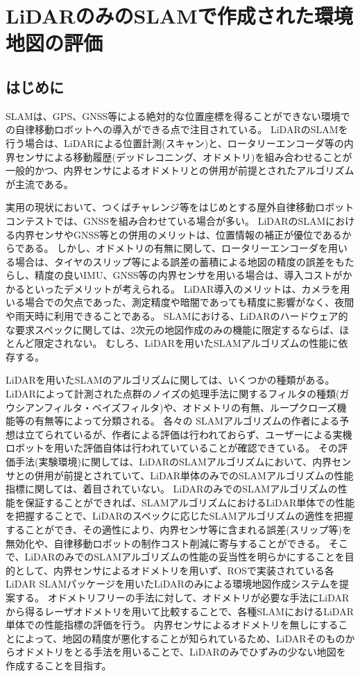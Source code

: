 \chapter{LiDARのみのSLAMで作成された環境地図の評価}
\section{はじめに}
SLAMは、GPS、GNSS等による絶対的な位置座標を得ることができない環境での自律移動ロボットへの導入ができる点で注目されている。
LiDARのSLAMを行う場合は、LiDARによる位置計測(スキャン)と、ロータリーエンコーダ等の内界センサによる移動履歴(デッドレコニング、オドメトリ)を組み合わせることが一般的かつ、内界センサによるオドメトリとの併用が前提とされたアルゴリズムが主流である。

実用の現状において、つくばチャレンジ等をはじめとする屋外自律移動ロボットコンテストでは、GNSSを組み合わせている場合が多い。
LiDARのSLAMにおける内界センサやGNSS等との併用のメリットは、位置情報の補正が優位であるからである。
しかし、オドメトリの有無に関して、ロータリーエンコーダを用いる場合は、タイヤのスリップ等による誤差の蓄積による地図の精度の誤差をもたらし、精度の良いIMU、GNSS等の内界センサを用いる場合は、導入コストがかかるといったデメリットが考えられる。
LiDAR導入のメリットは、カメラを用いる場合での欠点であった、測定精度や暗闇であっても精度に影響がなく、夜間や雨天時に利用できることである。
SLAMにおける、LiDARのハードウェア的な要求スペックに関しては、2次元の地図作成のみの機能に限定するならば、ほとんど限定されない。
むしろ、LiDARを用いたSLAMアルゴリズムの性能に依存する。

LiDARを用いたSLAMのアルゴリズムに関しては、いくつかの種類がある。
LiDARによって計測された点群のノイズの処理手法に関するフィルタの種類(ガウシアンフィルタ・ベイズフィルタ)や、オドメトリの有無、ループクローズ機能等の有無等によって分類される。
各々の SLAMアルゴリズムの作者による予想は立てられているが、作者による評価は行われておらず、ユーザーによる実機ロボットを用いた評価自体は行われていていることが確認できている。
その評価手法(実験環境)に関しては、LiDARのSLAMアルゴリズムにおいて、内界センサとの併用が前提とされていて、LiDAR単体のみでのSLAMアルゴリズムの性能指標に関しては、着目されていない。
LiDARのみでのSLAMアルゴリズムの性能を保証することができれば、SLAMアルゴリズムにおけるLiDAR単体での性能を把握することで、LiDARのスペックに応じたSLAMアルゴリズムの適性を把握することができ、その適性により、内界センサ等に含まれる誤差(スリップ等)を無効化や、自律移動ロボットの制作コスト削減に寄与することができる。
そこで、LiDARのみでのSLAMアルゴリズムの性能の妥当性を明らかにすることを目的として、内界センサによるオドメトリを用いず、ROSで実装されている各LiDAR SLAMパッケージを用いたLiDARのみによる環境地図作成システムを提案する。
オドメトリフリーの手法に対して、オドメトリが必要な手法にLiDARから得るレーザオドメトリを用いて比較することで、各種SLAMにおけるLiDAR単体での性能指標の評価を行う。
内界センサによるオドメトリを無しにすることによって、地図の精度が悪化することが知られているため、LiDARそのものからオドメトリをとる手法を用いることで、LiDARのみでひずみの少ない地図を作成することを目指す。

